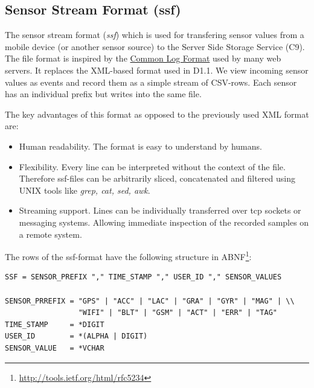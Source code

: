 \subsection{Sensor Stream Format (ssf)}\label{sec:ssf}
The sensor stream format ({\it ssf}) which is used for transfering
sensor values from a mobile device (or another sensor source) to the
Server Side Storage Service (C9). The file format is inspired by the
\href{http://en.wikipedia.org/wiki/Common\_Log\_Format}{Common Log
  Format} used by many web servers. It replaces the XML-based format
used in D1.1. We view incoming sensor values as events and record them
as a simple stream of CSV-rows. Each sensor has an individual prefix
but writes into the same file.

The key advantages of this format as opposed to the previously used
XML format are:
\begin{itemize}
\item Human readability. The format is easy to understand by humans.
\item Flexibility. Every line can be interpreted without the context
  of the file. Therefore ssf-files can be arbitrarily sliced,
  concatenated and filtered using UNIX tools like {\it grep, cat, sed,
    awk}.
\item Streaming support. Lines can be individually transferred over tcp
  sockets or messaging systems. Allowing immediate inspection of the
  recorded samples on a remote system.
\end{itemize}

The rows of the ssf-format have the following structure in ABNF\footnote{\url{http://tools.ietf.org/html/rfc5234}}:
\small
\begin{verbatim}
SSF = SENSOR_PREFIX "," TIME_STAMP "," USER_ID "," SENSOR_VALUES

SENSOR_PRREFIX = "GPS" | "ACC" | "LAC" | "GRA" | "GYR" | "MAG" | \\
                 "WIFI" | "BLT" | "GSM" | "ACT" | "ERR" | "TAG" 
TIME_STAMP     = *DIGIT
USER_ID        = *(ALPHA | DIGIT)
SENSOR_VALUE   = *VCHAR
\end{verbatim}
\normalsize

